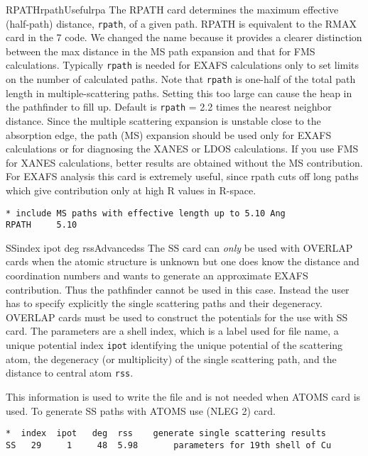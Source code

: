 \documentclass[11pt,oneside]{report} %
\begin{document}
\begin{Card}{RPATH}{rpath}{Useful}{rpa}
  The RPATH card determines the maximum effective (half-path)
  distance, \texttt{rpath}, of a given path. RPATH is equivalent to
  the RMAX card in the {\feff}7 code. We changed the name because it provides
  a clearer distinction between the max distance in the MS path expansion
  and that for FMS calculations.
  Typically \texttt{rpath} is needed for EXAFS calculations only to
  set limits on the number of calculated paths.  Note that
  \texttt{rpath} is one-half of the total path length in
  multiple-scattering paths.  Setting this too large can cause the
  heap in the pathfinder to fill up.  Default is \texttt{rpath} = 2.2
  times the nearest neighbor distance.  Since the multiple scattering
  expansion is unstable close to the absorption edge, the path (MS)
  expansion should be used only for EXAFS calculations or for
  diagnosing the XANES or LDOS calculations.  If you use FMS for XANES
  calculations, better results are obtained without the MS
  contribution.  For EXAFS analysis this card is extremely useful,
  since rpath cuts off long paths which give contribution only at high
  R values in R-space.
\begin{verbatim}
* include MS paths with effective length up to 5.10 Ang
RPATH     5.10
\end{verbatim}
\end{Card}


\begin{Card}{SS}{index ipot deg rss}{Advanced}{ss}
  The SS card can {\it only} be used with OVERLAP cards when the atomic
  structure is unknown but one does know the distance and coordination
  numbers and wants to generate an approximate EXAFS contribution.
  Thus the pathfinder cannot be used in this
  case. Instead the user has to specify explicitly the single
  scattering paths and their degeneracy.  OVERLAP cards must be used
  to construct the potentials for the use with SS card.  The
  parameters are a shell index, which is a label used for
   file name, a unique potential index \texttt{ipot}
  identifying the unique potential of the scattering atom, the
  degeneracy (or multiplicity) of the single scattering path,
  and the distance to central atom \texttt{rss}.

  This information is used to write the file  and is not
  needed when ATOMS card is used.  To generate SS paths with ATOMS use
  (NLEG 2) card.
\begin{verbatim}
*  index  ipot   deg  rss    generate single scattering results
SS   29     1     48  5.98       parameters for 19th shell of Cu
\end{verbatim}
\end{Card}
\end{document}
